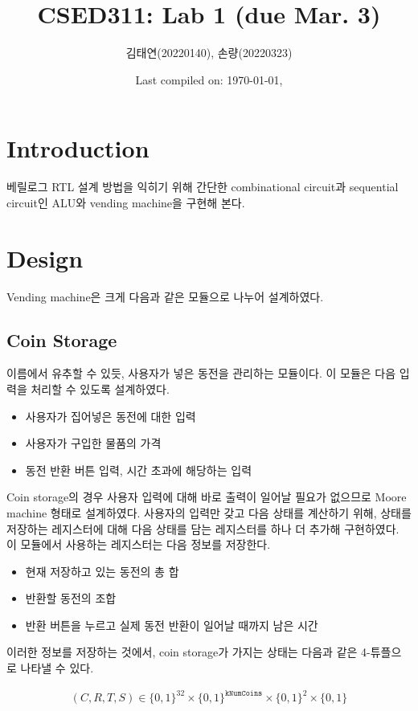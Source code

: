 \documentclass{scrartcl}
\title{CSED311: Lab 1 (due Mar. 3)}
\author{김태연(20220140), 손량(20220323)}
\date{Last compiled on: \today, \currenttime}
\begin{document}
\maketitle

\section{Introduction}
베릴로그 RTL 설계 방법을 익히기 위해 간단한 combinational circuit과 sequential circuit인 ALU와
vending machine을 구현해 본다.

\section{Design}
Vending machine은 크게 다음과 같은 모듈으로 나누어 설계하였다.

\subsection{Coin Storage}
이름에서 유추할 수 있듯, 사용자가 넣은 동전을 관리하는 모듈이다. 이 모듈은 다음 입력을 처리할 수 있도록 설계하였다.

\begin{itemize}
  \item 사용자가 집어넣은 동전에 대한 입력
  \item 사용자가 구입한 물품의 가격
  \item 동전 반환 버튼 입력, 시간 초과에 해당하는 입력
\end{itemize}

Coin storage의 경우 사용자 입력에 대해 바로 출력이 일어날 필요가 없으므로 Moore machine 형태로 설계하였다. 사용자의
입력만 갖고 다음 상태를 계산하기 위해, 상태를 저장하는 레지스터에 대해 다음 상태를 담는 레지스터를 하나 더 추가해 구현하였다. 이 모듈에서
사용하는 레지스터는 다음 정보를 저장한다.

\begin{itemize}
  \item 현재 저장하고 있는 동전의 총 합
  \item 반환할 동전의 조합
  \item 반환 버튼을 누르고 실제 동전 반환이 일어날 때까지 남은 시간
\end{itemize}

이러한 정보를 저장하는 것에서, coin storage가 가지는 상태는 다음과 같은 4-튜플으로 나타낼 수 있다.

\begin{align*}
  (C, R, T, S)
  \in \{0, 1\}^{32} \times \{0, 1\}^\texttt{kNumCoins} \times \{0, 1\}^2
  \times \{0, 1\}
\end{align*}
\end{document}
